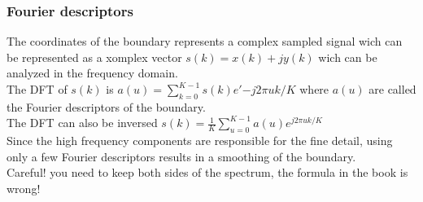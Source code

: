 \subsubsection{Fourier descriptors}
The coordinates of the boundary represents a complex sampled signal wich can be represented as a xomplex vector $s(k)=x(k)+jy(k)$ wich can be analyzed in the frequency domain.\\
The DFT of $s(k)$ is $a(u)=\sum\limits_{k=0}^{K-1}s(k)e'{-j2\pi uk/K}$ where $a(u)$ are called the Fourier descriptors of the boundary.\\
The DFT can also be inversed $s(k)=\frac{1}{K}\sum\limits_{u=0}^{K-1}a(u)e^{j2\pi uk/K}$\\
Since the high frequency components are responsible for the fine detail, using only a few Fourier descriptors results in a smoothing of the boundary.\\
Careful! you need to keep both sides of the spectrum, the formula in the book is wrong!\\
